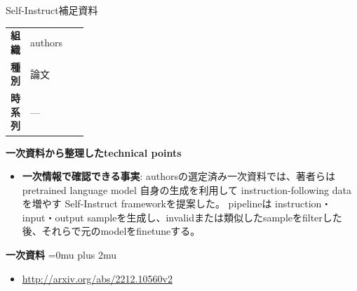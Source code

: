 \begin{technicalnote}{Self-Instruct}{補足資料}
\begingroup
\begin{tabularx}{\linewidth}{@{}>{\bfseries}p{0.22\linewidth}X@{}}
組織 & authors \\
種別 & 論文 \\
時系列 & — \\
\end{tabularx}
\smallskip
{\bfseries 一次資料から整理したtechnical points}
\begin{itemize}[leftmargin=1.5em,itemsep=0.35em]
\item \textbf{一次情報で確認できる事実}: authorsの選定済み一次資料では、著者らは pretrained language model 自身の生成を利用して instruction-following data を増やす Self-Instruct frameworkを提案した。 pipelineは instruction・input・output sampleを生成し、invalidまたは類似したsampleをfilterした後、それらで元のmodelをfinetuneする。
\end{itemize}
\begin{minipage}{\linewidth}
\begin{samepage}
{\bfseries 一次資料}
\begingroup\sloppy
\Urlmuskip=0mu plus 2mu\relax
\begin{itemize}[leftmargin=1.5em,itemsep=0.25em]
\item {\scriptsize\url{http://arxiv.org/abs/2212.10560v2}}
\end{itemize}
\endgroup
\end{samepage}
\end{minipage}
\endgroup
\end{technicalnote}
\medskip

